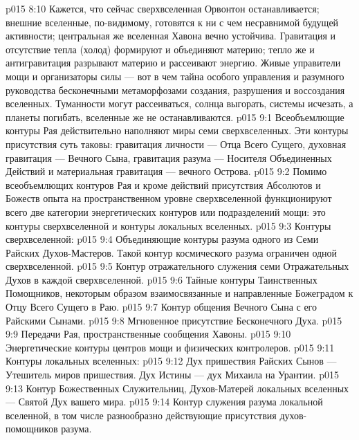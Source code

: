 \vs p015 8:10 Кажется, что сейчас сверхвселенная Орвонтон останавливается; внешние вселенные, по\hyp{}видимому, готовятся к ни с чем несравнимой будущей активности; центральная же вселенная Хавона вечно устойчива. Гравитация и отсутствие тепла (холод) формируют и объединяют материю; тепло же и антигравитация разрывают материю и рассеивают энергию. Живые управители мощи и организаторы силы --- вот в чем тайна особого управления и разумного руководства бесконечными метаморфозами создания, разрушения и воссоздания вселенных. Туманности могут рассеиваться, солнца выгорать, системы исчезать, а планеты погибать, вселенные же не останавливаются.
\vs p015 9:1 Всеобъемлющие контуры Рая действительно наполняют миры семи сверхвселенных. Эти контуры присутствия суть таковы: гравитация личности --- Отца Всего Сущего, духовная гравитация --- Вечного Сына, гравитация разума --- Носителя Объединенных Действий и материальная гравитация --- вечного Острова.
\vs p015 9:2 Помимо всеобъемлющих контуров Рая и кроме действий присутствия Абсолютов и Божеств опыта на пространственном уровне сверхвселенной функционируют всего две категории энергетических контуров или подразделений мощи: это контуры сверхвселенной и контуры локальных вселенных.
\vs p015 9:3 \pc Контуры сверхвселенной:
\vs p015 9:4 \bibnobreakspace Объединяющие контуры разума одного из Семи Райских Духов\hyp{}Мастеров. Такой контур космического разума ограничен одной сверхвселенной.
\vs p015 9:5 \bibnobreakspace Контур отражательного служения семи Отражательных Духов в каждой сверхвселенной.
\vs p015 9:6 \bibnobreakspace Тайные контуры Таинственных Помощников, некоторым образом взаимосвязанные и направленные Божеградом к Отцу Всего Сущего в Раю.
\vs p015 9:7 \bibnobreakspace Контур общения Вечного Сына с его Райскими Сынами.
\vs p015 9:8 \bibnobreakspace Мгновенное присутствие Бесконечного Духа.
\vs p015 9:9 \bibnobreakspace Передачи Рая, пространственные сообщения Хавоны.
\vs p015 9:10 \bibnobreakspace Энергетические контуры центров мощи и физических контролеров.
\vs p015 9:11 \pc Контуры локальных вселенных:
\vs p015 9:12 \pc {}\bibnobreakspace Дух пришествия Райских Сынов --- Утешитель миров пришествия. Дух Истины --- дух Михаила на Урантии.
\vs p015 9:13 \bibnobreakspace Контур Божественных Служительниц, Духов\hyp{}Матерей локальных вселенных --- Святой Дух вашего мира.
\vs p015 9:14 \bibnobreakspace Контур служения разума локальной вселенной, в том числе разнообразно действующие присутствия духов\hyp{}помощников разума.
